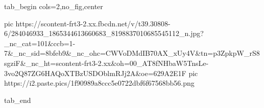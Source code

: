  
 
 
 
 

\ifcmt
  tab_begin cols=2,no_fig,center

     pic https://scontent-frt3-2.xx.fbcdn.net/v/t39.30808-6/284046933_1865344613660683_8198837010685545112_n.jpg?_nc_cat=101&ccb=1-7&_nc_sid=8bfeb9&_nc_ohc=CWVoDMdIB70AX_xUy4V&tn=p3ZpkpW_rS8sgziF&_nc_ht=scontent-frt3-2.xx&oh=00_AT8fNHbaW5TnsLe-3vo2Q87ZG6HAQoXTBzUSDOblmRJj2A&oe=629A2E1F
		 pic https://i2.paste.pics/1f90989a8ccc5e0722dbf6f67568bb56.png

  tab_end
\fi
